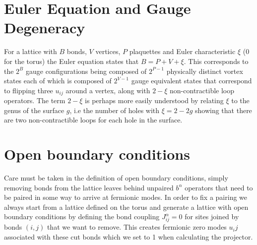 \documentclass[%
 reprint,
superscriptaddress,
 amsmath,amssymb,
aps,
]{revtex4-2}
\begin{document}


\section{Euler Equation and Gauge Degeneracy}
For a lattice with \(B\) bonds, \(V\) vertices, \(P\) plaquettes and Euler characteristic \(\xi\) (0 for the torus) the Euler equation states that \(B = P + V + \xi\). This corresponds to the \(2^{B}\) gauge configurations being composed of \(2^{P - 1}\) physically distinct vortex states each of which is composed of \(2^{V - 1}\) gauge equivalent states that correspond to flipping three \(u_{ij}\) around a vertex, along with \(2 - \xi\) non-contractible loop operators. The term \(2 - \xi\) is perhaps more easily understood by relating \(\xi\) to the genus of the surface \(g\), i.e the number of holes with \(\xi = 2 - 2g\) showing that there are two non-contractible loops for each hole in the surface. 

\section{Open boundary conditions}
Care must be taken in the definition of open boundary conditions, simply removing bonds from the lattice leaves behind unpaired \(b^\alpha\) operators that need to be paired in some way to arrive at fermionic modes. In order to fix a pairing we always start from a lattice defined on the torus and generate a lattice with open boundary conditions by defining the bond coupling \(J^{\alpha}_{ij} = 0\) for sites joined by bonds \((i,j)\) that we want to remove. This creates fermionic zero modes \(u_ij\) associated with these cut bonds which we set to 1 when calculating the projector. 
\end{document}
